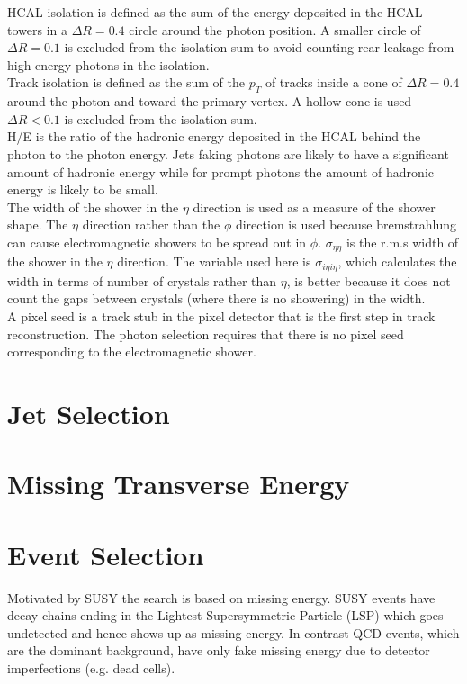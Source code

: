 HCAL isolation is defined as the sum of the energy deposited in the HCAL towers
in a $\Delta R = 0.4$ circle around the photon position. A smaller circle of 
$\Delta R = 0.1$ is excluded from the isolation sum to avoid counting 
rear-leakage from high energy photons in the isolation. \\ 

Track isolation is defined as the sum of the $p_{T}$ of tracks inside a cone of
$\Delta R = 0.4$ around the photon and toward the primary vertex. A hollow cone 
is used $\Delta R < 0.1$ is excluded from the isolation sum. \\

H/E is the ratio of the hadronic energy deposited in the HCAL behind the photon
to the photon energy. Jets faking photons are likely to have a significant 
amount of hadronic energy while for prompt photons the amount of hadronic energy
is likely to be small. \\

The width of the shower in the $\eta$ direction is used as a measure of the
shower shape. The $\eta$ direction rather than the $\phi$ direction is used 
because bremstrahlung can cause electromagnetic showers to be spread out in 
$\phi$. $\sigma_{\eta\eta}$ is the r.m.s width of the shower in the $\eta$ 
direction. The variable used here is $\sigma_{i\eta i\eta}$, which calculates 
the width in terms of number of crystals rather than $\eta$, is better because 
it does not count the gaps between crystals (where there is no showering) in the
width. \\

A pixel seed is a track stub in the pixel detector that is the first step in
track reconstruction. The photon selection requires that there is no pixel seed
corresponding to the electromagnetic shower.

\section{Jet Selection}

\section{Missing Transverse Energy}

\section{Event Selection}

Motivated by SUSY the search is based on missing energy. SUSY events have decay
chains ending in the Lightest Supersymmetric Particle (LSP) which goes
undetected and hence shows up as missing energy. In contrast QCD events, which
are the dominant background, have only fake missing energy due to detector
imperfections (e.g. dead cells). \\

